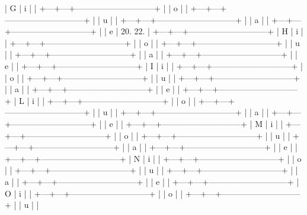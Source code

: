 | G | i |                             |
+---+---+-----------------------------+
|   | o |                             |
+---+---+-----------------------------+
|   | u |                             |
+---+---+-----------------------------+
|   | a |                             |
+---+---+-----------------------------+
|   | e | 20. 22.                     |
+---+---+-----------------------------+
| H | i |                             |
+---+---+-----------------------------+
|   | o |                             |
+---+---+-----------------------------+
|   | u |                             |
+---+---+-----------------------------+
|   | a |                             |
+---+---+-----------------------------+
|   | e |                             |
+---+---+-----------------------------+
| I | i |                             |
+---+---+-----------------------------+
|   | o |                             |
+---+---+-----------------------------+
|   | u |                             |
+---+---+-----------------------------+
|   | a |                             |
+---+---+-----------------------------+
|   | e |                             |
+---+---+-----------------------------+
| L | i |                             |
+---+---+-----------------------------+
|   | o |                             |
+---+---+-----------------------------+
|   | u |                             |
+---+---+-----------------------------+
|   | a |                             |
+---+---+-----------------------------+
|   | e |                             |
+---+---+-----------------------------+
| M | i |                             |
+---+---+-----------------------------+
|   | o |                             |
+---+---+-----------------------------+
|   | u |                             |
+---+---+-----------------------------+
|   | a |                             |
+---+---+-----------------------------+
|   | e |                             |
+---+---+-----------------------------+
| N | i |                             |
+---+---+-----------------------------+
|   | o |                             |
+---+---+-----------------------------+
|   | u |                             |
+---+---+-----------------------------+
|   | a |                             |
+---+---+-----------------------------+
|   | e |                             |
+---+---+-----------------------------+
| O | i |                             |
+---+---+-----------------------------+
|   | o |                             |
+---+---+-----------------------------+
|   | u |                             |
